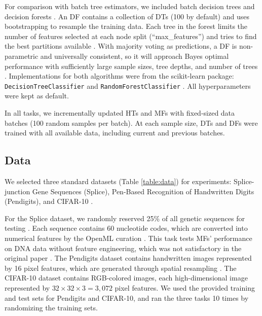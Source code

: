 For comparison with batch tree estimators, we included batch decision trees and decision forests \citep{breiman_random_2001}. An DF contains a collection of DTs (100 by default) and uses bootstrapping to resample the training data. Each tree in the forest limits the number of features selected at each node split (``max\_features'') and tries to find the best partitions available \citep{breiman_random_2001}.
With majority voting as predictions, a DF is non-parametric and universally consistent, so it will approach Bayes optimal performance with sufficiently large sample sizes, tree depths, and number of trees \citep{liaw_classification_2002, biau_consistency_2008}.
Implementations for both algorithms were from the scikit-learn package: \texttt{DecisionTreeClassifier} and \texttt{RandomForestClassifier} \citep{pedregosa_scikit-learn_2011}. All hyperparameters were kept as default.

In all tasks, we incrementally updated HTs and MFs with fixed-sized data batches (100 random samples per batch). At each sample size, DTs and DFs were trained with all available data, including current and previous batches. 

\subsection{Data}
We selected three standard datasets (Table \ref{table:data}) for experiments: Splice-junction Gene Sequences (Splice), Pen-Based Recognition of Handwritten Digits (Pendigits), and CIFAR-10 \citep{towell_molecular_1991, alpaydin_pen-based_1998, krizhevsky_learning_2012, lavanya_handwritten_2017}.

For the Splice dataset, we randomly reserved 25\% of all genetic sequences for testing \citep{rampone_splice-junction_1998, sarkar_splice_2020}. Each sequence contains 60 nucleotide codes, which are converted into numerical features by the OpenML curation \citep{feurer_openml-python_2019}. This task tests MFs' performance on DNA data without feature engineering, which was not satisfactory in the original paper \cite{lakshminarayanan_mondrian_2014}. 
The Pendigits dataset contains handwritten images represented by 16 pixel features, which are generated through spatial resampling \citep{alimoglu_methods_1996}.
The CIFAR-10 dataset contains RGB-colored images, each high-dimensional image represented by $32 \times 32 \times 3 = 3,072$ pixel features. We used the provided training and test sets for Pendigits and CIFAR-10, and ran the three tasks 10 times by randomizing the training sets. 

